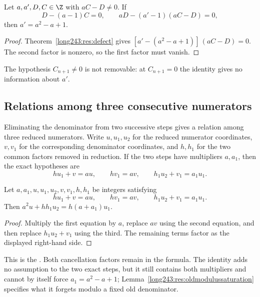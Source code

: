 \begin{theorem}\label{long243:res:step}
Let $a,a',D,C\in\Z$ with $aC-D\ne0$. If
\[
 D-(a-1)C=0,\qquad aD-(a'-1)(aC-D)=0,
\]
then $a'=a^2-a+1$.
\end{theorem}

\begin{proof}
Theorem~\ref{long243:res:defect} gives
$[a'-(a^2-a+1)]\,(aC-D)=0$. The second factor is nonzero, so the first
factor must vanish.
\end{proof}

  The hypothesis $C_{n+1}\ne0$ is not removable: at $C_{n+1}=0$
the identity gives no information about $a'$.

\subsection{Relations among three consecutive numerators}

Eliminating the denominator from two successive steps gives a relation
among three reduced numerators.  Write $u,u_1,u_2$ for the
reduced numerator coordinates, $v,v_1$ for the corresponding denominator
coordinates, and $h,h_1$ for the two common factors removed in reduction.  If
the two steps have multipliers $a,a_1$, then the exact hypotheses are
\[
 hu_1+v=au,\qquad hv_1=av,\qquad
 h_1u_2+v_1=a_1u_1.
\]

\begin{theorem}\label{long243:res:secondorder}
Let $a,a_1,u,u_1,u_2,v,v_1,h,h_1$ be integers satisfying
\[
 hu_1+v=au,\qquad hv_1=av,\qquad h_1u_2+v_1=a_1u_1.
\]
Then $a^2u+hh_1u_2=h(a+a_1)u_1$.
\end{theorem}

\begin{proof}
Multiply the first equation by $a$, replace $av$ using the second equation,
and then replace $h_1u_2+v_1$ using the third.  The remaining terms factor as
the displayed right-hand side.
\end{proof}

\noindent This is the
.  Both cancellation factors remain in the formula. The identity adds no
assumption to the two exact steps, but it still contains both multipliers
and cannot by itself force $a_1=a^2-a+1$;
Lemma~\ref{long243:res:oldmodulussaturation} specifies what it forgets
modulo a fixed old denominator.


